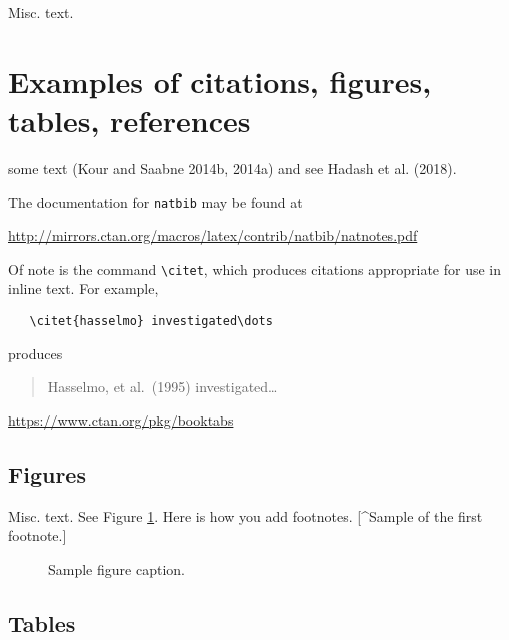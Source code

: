 \documentclass{article}
\begin{document}
Misc. text.

\hypertarget{examples-of-citations-figures-tables-references}{%
\section{Examples of citations, figures, tables,
references}\label{examples-of-citations-figures-tables-references}}

\label{sec:others}

some text (Kour and Saabne 2014b, 2014a) and see Hadash et al. (2018).

The documentation for \verb+natbib+ may be found at

\begin{center}
  \url{http://mirrors.ctan.org/macros/latex/contrib/natbib/natnotes.pdf}
\end{center}

Of note is the command \verb+\citet+, which produces citations
appropriate for use in inline text. For example,

\begin{verbatim}
   \citet{hasselmo} investigated\dots
\end{verbatim}

produces

\begin{quote}
  Hasselmo, et al.\ (1995) investigated\dots
\end{quote}

\begin{center}
  \url{https://www.ctan.org/pkg/booktabs}
\end{center}

\hypertarget{figures}{%
\subsection{Figures}\label{figures}}

Misc. text. See Figure \ref{fig:fig1}. Here is how you add footnotes.
{[}\^{}Sample of the first footnote.{]}

\begin{figure}
  \centering
  \fbox{\rule[-.5cm]{4cm}{4cm} \rule[-.5cm]{4cm}{0cm}}
  \caption{Sample figure caption.}
  \label{fig:fig1}
\end{figure}

\hypertarget{tables}{%
\subsection{Tables}\label{tables}}
\end{document}
